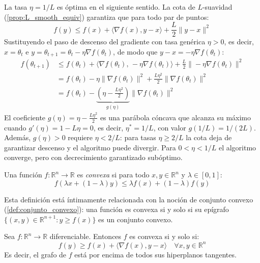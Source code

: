 La tasa \(\eta = 1/L\) es óptima en el siguiente sentido. La cota de \(L\)-suavidad
(\autoref{prop:L_smooth_equiv}) garantiza que para todo par de puntos:
\[
	f(y) \leq f(x) + \langle \nabla f(x), y - x \rangle + \frac{L}{2}\|y - x\|^2
\]
Sustituyendo el paso de descenso del gradiente con tasa genérica \(\eta > 0\),
es decir, \(x = \theta_t\) e \(y = \theta_{t+1} = \theta_t - \eta\nabla f(\theta_t)\),
de modo que \(y - x = -\eta\nabla f(\theta_t)\):
\begin{align*}
	f(\theta_{t+1})
		&\leq f(\theta_t) + \langle \nabla f(\theta_t),\, -\eta\nabla f(\theta_t) \rangle
			+ \frac{L}{2}\|\!-\eta\nabla f(\theta_t)\|^2 \\
		&= f(\theta_t) - \eta\|\nabla f(\theta_t)\|^2
			+ \frac{L\eta^2}{2}\|\nabla f(\theta_t)\|^2 \\
		&= f(\theta_t)
			- \underbrace{\left(\eta - \frac{L\eta^2}{2}\right)}_{g(\eta)}
			\|\nabla f(\theta_t)\|^2
\end{align*}
El coeficiente \(g(\eta) = \eta - \frac{L\eta^2}{2}\) es una parábola cóncava que alcanza su máximo cuando \(g'(\eta) = 1 - L\eta = 0\), es decir, \(\eta^* = 1/L\), con valor \(g(1/L) = 1/(2L)\). Además, \(g(\eta) > 0\) requiere \(\eta < 2/L\): para tasas \(\eta \geq 2/L\) la cota deja de garantizar descenso y el algoritmo puede divergir. Para \(0 < \eta < 1/L\) el algoritmo converge, pero con decrecimiento garantizado subóptimo.

\begin{definition}\label{def:convex_function}
	Una función \(f: \mathbb{R}^n \to \mathbb{R}\) es \textit{convexa} si para todo \(x, y \in \mathbb{R}^n\) y \(\lambda \in [0,1]\):
	\[
		f(\lambda x + (1-\lambda)y) \leq \lambda f(x) + (1-\lambda)f(y)
	\]
\end{definition}

Esta definición está íntimamente relacionada con la noción de conjunto convexo (\autoref{def:conjunto_convexo}): una función es convexa si y solo si su epígrafo $\{(x,y) \in \mathbb{R}^{n+1} : y \geq f(x)\}$ es un conjunto convexo.

\begin{proposition}\label{prop:convex_equiv}
	Sea \(f: \mathbb{R}^n \to \mathbb{R}\) diferenciable. Entonces \(f\) es convexa si y solo si:
	\[
		f(y) \geq f(x) + \langle \nabla f(x), y - x \rangle \quad \forall x, y \in \mathbb{R}^n
	\]
	Es decir, el grafo de \(f\) está por encima de todos sus hiperplanos tangentes.
\end{proposition}

